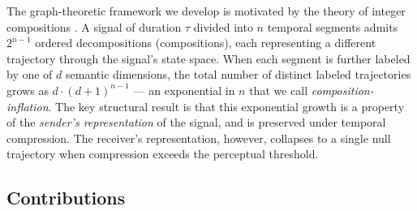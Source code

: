 \documentclass[twocolumn,11pt,a4paper]{article}
\theoremstyle{main}
\theoremstyle{definition}
\theoremstyle{remark}
\begin{document}
The graph-theoretic framework we develop is motivated by the theory of
integer compositions \citep{andrews1976,heubach2009}. A signal of
duration $\tau$ divided into $n$ temporal segments admits $2^{n-1}$
ordered decompositions (compositions), each representing a different
trajectory through the signal's state space. When each segment is
further labeled by one of $d$ semantic dimensions, the total number of
distinct labeled trajectories grows as $d \cdot (d+1)^{n-1}$ --- an
exponential in $n$ that we call \emph{composition-inflation}. The key
structural result is that this exponential growth is a property of the
\emph{sender's representation} of the signal, and is preserved under
temporal compression. The receiver's representation, however, collapses
to a single null trajectory when compression exceeds the perceptual
threshold.

\subsection{Contributions}
\end{document}
